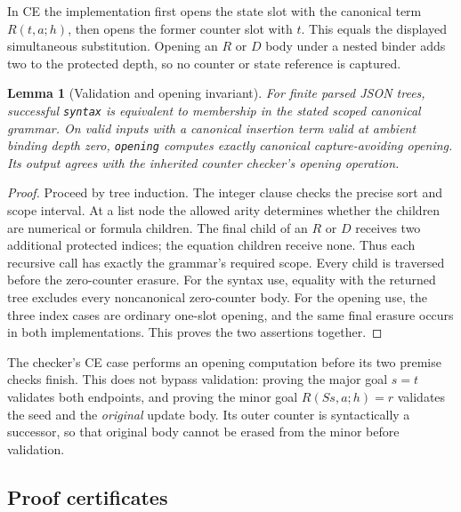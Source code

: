 \documentclass[10pt,letterpaper]{article}
\newtheorem{lemma}[theorem]{Lemma}
\theoremstyle{definition}
\theoremstyle{remark}
\begin{document}
In CE the implementation first opens the state slot with the canonical
term $R(t,a;h)$, then opens the former counter slot with $t$. This equals
the displayed simultaneous substitution. Opening an $R$ or $D$ body
under a nested binder adds two to the protected depth, so no counter or
state reference is captured.

\begin{lemma}[Validation and opening invariant]\label{lem:walker}
For finite parsed JSON trees, successful \texttt{syntax} is equivalent
to membership in the stated scoped canonical grammar. On valid inputs
with a canonical insertion term valid at ambient binding depth zero, \texttt{opening} computes exactly
canonical capture-avoiding opening. Its output agrees with the inherited
counter checker's opening operation.
\end{lemma}
\begin{proof}
Proceed by tree induction. The integer clause checks the precise sort
and scope interval. At a list node the allowed arity determines whether
the children are numerical or formula children. The final child of an
$R$ or $D$ receives two additional protected indices; the equation
children receive none. Thus each recursive call has exactly the grammar's
required scope. Every child is traversed before the zero-counter erasure.
For the syntax use, equality with the returned tree excludes every
noncanonical zero-counter body. For the opening use, the three index
cases are ordinary one-slot opening, and the same final erasure occurs
in both implementations. This proves the two assertions together.
\end{proof}

The checker's CE case performs an opening computation before its two
premise checks finish. This does not bypass validation: proving the
major goal $s=t$ validates both endpoints, and proving the minor goal
$R(Ss,a;h)=r$ validates the seed and the \emph{original} update body.
Its outer counter is syntactically a successor, so that original body
cannot be erased from the minor before validation.

\subsection{Proof certificates}
\end{document}
